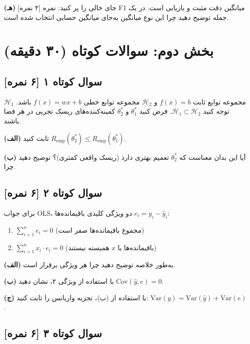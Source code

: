 \documentclass[12pt,a4paper]{article}
\begin{document}
\bigskip

\textbf{(هـ)} [۲ نمره] جای خالی را پر کنید: نمره F1 میانگین \underline{\hspace{3cm}} دقت مثبت و بازیابی است. در یک جمله توضیح دهید چرا این نوع میانگین به‌جای میانگین حسابی انتخاب شده است.

\newpage

\section*{بخش دوم: سوالات کوتاه (۳۰ دقیقه)}

\subsection*{سوال کوتاه ۱ [۶ نمره]}

$\mathcal{H}_1$ مجموعه توابع ثابت $f(x) = b$ و $\mathcal{H}_2$ مجموعه توابع خطی $f(x) = wx + b$ باشد. توجه کنید $\mathcal{H}_1 \subset \mathcal{H}_2$. فرض کنید $\theta_1^*$ و $\theta_2^*$ کمینه‌کننده‌های ریسک تجربی در هر فضا باشند.

\textbf{(الف)} ثابت کنید $R_{\text{emp}}(\theta_2^*) \leq R_{\text{emp}}(\theta_1^*)$.

\textbf{(ب)} آیا این بدان معناست که $\theta_2^*$ تعمیم بهتری دارد (ریسک واقعی کمتری)؟ توضیح دهید چرا.

\bigskip

\subsection*{سوال کوتاه ۲ [۶ نمره]}

برای جواب OLS، دو ویژگی کلیدی باقیمانده‌ها $e_i = y_i - \hat{y}_i$:

\begin{enumerate}
\item $\sum_{i=1}^n e_i = 0$ (مجموع باقیمانده‌ها صفر است)
\item $\sum_{i=1}^n x_i \cdot e_i = 0$ (باقیمانده‌ها با $x$ همبسته نیستند)
\end{enumerate}

\textbf{(الف)} به‌طور خلاصه توضیح دهید چرا هر ویژگی برقرار است.

\textbf{(ب)} با استفاده از ویژگی ۲، نشان دهید $\text{Cov}(\hat{y}, e) = 0$.

\textbf{(ج)} با استفاده از (ب)، تجزیه واریانس را ثابت کنید: $\text{Var}(y) = \text{Var}(\hat{y}) + \text{Var}(e)$.

\bigskip

\subsection*{سوال کوتاه ۳ [۶ نمره]}
\end{document}
